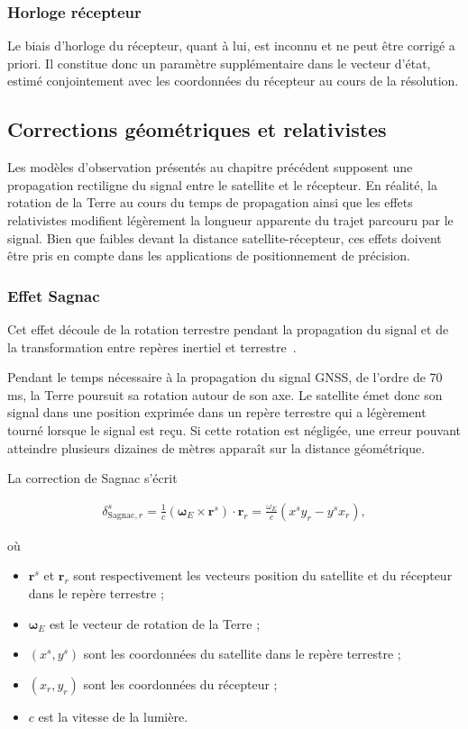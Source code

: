 \subsubsection{Horloge récepteur}

Le biais d'horloge du récepteur, quant à lui, est inconnu et ne peut être corrigé a priori. Il constitue donc un paramètre supplémentaire dans le vecteur d'état, estimé conjointement avec les coordonnées du récepteur au cours de la résolution.

\subsection{Corrections géométriques et relativistes}

Les modèles d'observation présentés au chapitre précédent supposent une propagation rectiligne du signal entre le satellite et le récepteur. En réalité, la rotation de la Terre au cours du temps de propagation ainsi que les effets relativistes modifient légèrement la longueur apparente du trajet parcouru par le signal. Bien que faibles devant la distance satellite-récepteur, ces effets doivent être pris en compte dans les applications de positionnement de précision.

\subsubsection{Effet Sagnac}\label{sagnac}

Cet effet découle de la rotation terrestre pendant la propagation du signal et
de la transformation entre repères inertiel et terrestre~\cite{ashby2003}.

Pendant le temps nécessaire à la propagation du signal GNSS, de l'ordre de 70 ms, la Terre poursuit sa rotation autour de son axe. Le satellite émet donc son signal dans une position exprimée dans un repère terrestre qui a légèrement tourné lorsque le signal est reçu. Si cette rotation est négligée, une erreur pouvant atteindre plusieurs dizaines de mètres apparaît sur la distance géométrique.

La correction de Sagnac s'écrit

\begin{align}
\delta_{\mathrm{Sagnac},r}^s
=
\frac{1}{c} (\boldsymbol\omega_E \times \mathbf r^s)\cdot\mathbf r_r
=
\frac{\omega_E}{c}
\left(
x^s y_r
-
y^s x_r
\right),
\end{align}

où

\begin{itemize}
    \item $\mathbf r^s$ et $\mathbf r_r$ sont respectivement les vecteurs position du satellite et du récepteur dans le repère terrestre ;
    \item $\boldsymbol\omega_E$ est le vecteur de rotation de la Terre ;
    \item $(x^s,y^s)$ sont les coordonnées du satellite dans le repère terrestre ;
    \item $(x_r,y_r)$ sont les coordonnées du récepteur ;
    \item $c$ est la vitesse de la lumière.
\end{itemize}

